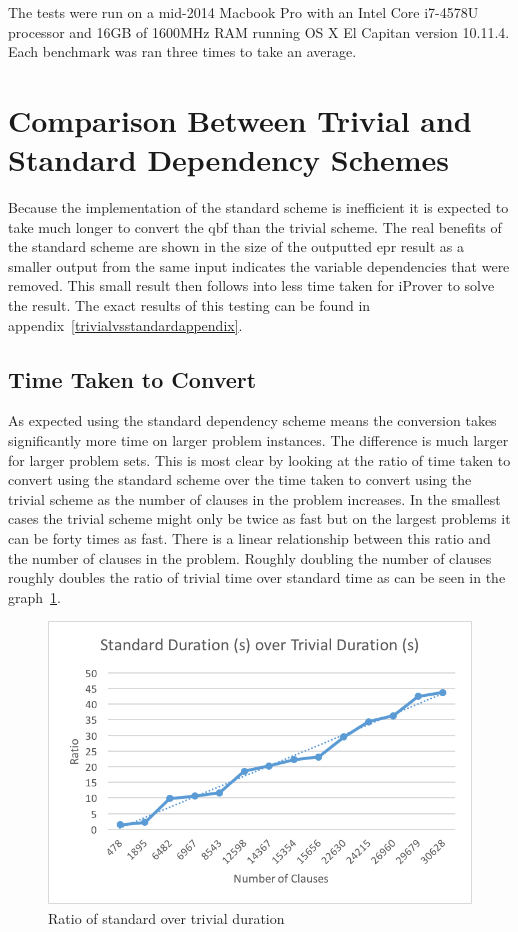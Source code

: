 The tests were run on a mid-2014 Macbook Pro with an Intel Core i7-4578U processor and 16GB of 1600MHz RAM running OS X El Capitan version 10.11.4. Each benchmark was ran three times to take an average.

\section{Comparison Between Trivial and Standard Dependency Schemes} \label{trivialvsstd}
Because the implementation of the standard scheme is inefficient it is expected to take much longer to convert the \gls{qbf} than the trivial scheme. The real benefits of the standard scheme are shown in the size of the outputted \gls{epr} result as a smaller output from the same input indicates the variable dependencies that were removed. This small result then follows into less time taken for iProver to solve the result. The exact results of this testing can be found in appendix~\ref{trivialvsstandardappendix}.

\subsection{Time Taken to Convert}
As expected using the standard dependency scheme means the conversion takes significantly more time on larger problem instances. The difference is much larger for larger problem sets. This is most clear by looking at the ratio of time taken to convert using the standard scheme over the time taken to convert using the trivial scheme as the number of clauses in the problem increases. In the smallest cases the trivial scheme might only be twice as fast but on the largest problems it can be forty times as fast. There is a linear relationship between this ratio and the number of clauses in the problem. Roughly doubling the number of clauses roughly doubles the ratio of trivial time over standard time as can be seen in the graph~\ref{standarddurationovertrivialduration}.

\begin{figure}[h]
\caption{Ratio of standard over trivial duration}
\label{standarddurationovertrivialduration}
\begin{CenteredBox}
\includegraphics{standarddurationovertrivialduration.png}
\end{CenteredBox}
\end{figure}

